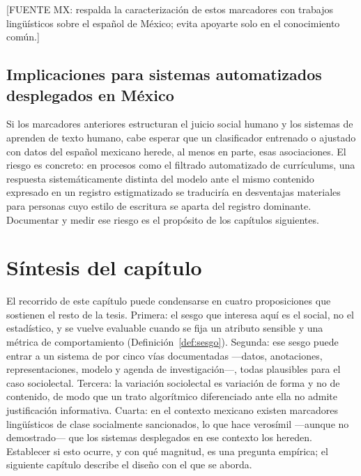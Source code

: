[FUENTE MX: respalda la caracterización de estos marcadores con trabajos
lingüísticos sobre el español de México; evita apoyarte solo en el conocimiento
común.]

\subsection{Implicaciones para sistemas automatizados desplegados en México}
\label{sec:implicaciones-mx}

Si los marcadores anteriores estructuran el juicio social humano y los sistemas
de \PLN aprenden de texto humano, cabe esperar que un clasificador entrenado
o ajustado con datos del español mexicano herede, al menos en parte, esas
asociaciones. El riesgo es concreto: en procesos como el filtrado automatizado
de currículums, una respuesta sistemáticamente distinta del modelo ante el
mismo contenido expresado en un registro estigmatizado se traduciría en
desventajas materiales para personas cuyo estilo de escritura se aparta del
registro dominante. Documentar y medir ese riesgo es el propósito de los
capítulos siguientes.

\section*{Síntesis del capítulo}

El recorrido de este capítulo puede condensarse en cuatro proposiciones que
sostienen el resto de la tesis. Primera: el sesgo que interesa aquí es el
social, no el estadístico, y se vuelve evaluable cuando se fija un atributo
sensible y una métrica de comportamiento (Definición~\ref{def:sesgo}). Segunda:
ese sesgo puede entrar a un sistema de \PLN por cinco vías documentadas
---datos, anotaciones, representaciones, modelo y agenda de investigación---,
todas plausibles para el caso sociolectal. Tercera: la variación sociolectal es
variación de forma y no de contenido, de modo que un trato algorítmico
diferenciado ante ella no admite justificación informativa. Cuarta: en el
contexto mexicano existen marcadores lingüísticos de clase socialmente
sancionados, lo que hace verosímil ---aunque no demostrado--- que los sistemas
desplegados en ese contexto los hereden. Establecer si esto ocurre, y con qué
magnitud, es una pregunta empírica; el siguiente capítulo describe el diseño
con el que se aborda.
